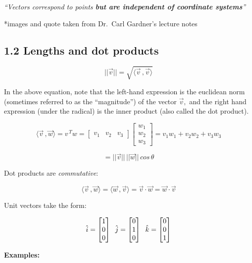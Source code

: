\documentclass{article}
\begin{document}
    \emph{``Vectors correspond to points \textbf{but are independent of
coordinate systems}''}

*images and quote taken from Dr.~Carl Gardner's lecture notes

    \subsection{1.2 Lengths and dot
products}\label{lengths-and-dot-products}

\[||\vec{v}|| = \sqrt{\langle \vec{v} \, , \vec{v} \rangle}\]

In the above equation, note that the left-hand expression is the
euclidean norm (sometimes referred to as the ``magnitude'') of the
vector \(\vec{v},\) and the right hand expression (under the radical) is
the inner product (also called the dot product).

\[\langle \vec{v} \, , \vec{w} \rangle = v^{\, T}w = \begin{bmatrix} v_{1} & v_{2} & v_{3} \end{bmatrix} \begin{bmatrix} w_{1} \\ w_{2} \\ w_{3} \end{bmatrix} = v_{1}w_{1} + v_{2}w_{2} + v_{3}w_{3}\]

\[=||\vec{v}|| \, ||\vec{w}|| \, cos \, \theta\]

Dot products are \emph{commutative}:

\[\langle \vec{v} \, , \vec{w} \rangle = \langle \vec{w} \, , \vec{v} \rangle = \vec{v} \cdot \vec{w} = \vec{w} \cdot \vec{v}\]

Unit vectors take the form:

\[\hat{i} = \begin{bmatrix} 1 \\ 0 \\ 0 \end{bmatrix} \hspace{.2cm} \hat{j} = \begin{bmatrix} 0 \\ 1 \\ 0 \end{bmatrix} \hspace{.2cm} \hat{k} = \begin{bmatrix} 0 \\ 0 \\ 1 \end{bmatrix} \]

    \textbf{Examples:}
\end{document}
